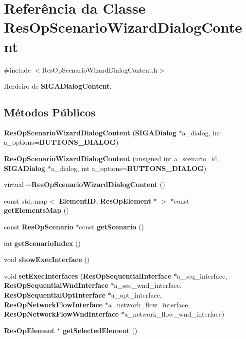 \section{Referência da Classe Res\+Op\+Scenario\+Wizard\+Dialog\+Content}
\label{class_res_op_scenario_wizard_dialog_content}


{\ttfamily \#include $<$Res\+Op\+Scenario\+Wizard\+Dialog\+Content.\+h$>$}



Herdeiro de {\bf S\+I\+G\+A\+Dialog\+Content}.

\subsection*{Métodos Públicos}
\begin{DoxyCompactItemize}
\item 
{\bf Res\+Op\+Scenario\+Wizard\+Dialog\+Content} ({\bf S\+I\+G\+A\+Dialog} $\ast$a\+\_\+dialog, int a\+\_\+options={\bf B\+U\+T\+T\+O\+N\+S\+\_\+\+D\+I\+A\+L\+OG})
\item 
{\bf Res\+Op\+Scenario\+Wizard\+Dialog\+Content} (unsigned int a\+\_\+scenario\+\_\+id, {\bf S\+I\+G\+A\+Dialog} $\ast$a\+\_\+dialog, int a\+\_\+options={\bf B\+U\+T\+T\+O\+N\+S\+\_\+\+D\+I\+A\+L\+OG})
\item 
virtual {\bf $\sim$\+Res\+Op\+Scenario\+Wizard\+Dialog\+Content} ()
\item 
const std\+::map$<$ {\bf Element\+ID}, {\bf Res\+Op\+Element} $\ast$ $>$ $\ast$const {\bf get\+Elements\+Map} ()
\item 
const {\bf Res\+Op\+Scenario} $\ast$const {\bf get\+Scenario} ()
\item 
int {\bf get\+Scenario\+Index} ()
\item 
void {\bf show\+Exec\+Interface} ()
\item 
void {\bf set\+Exec\+Interfaces} ({\bf Res\+Op\+Sequential\+Interface} $\ast$a\+\_\+seq\+\_\+interface, {\bf Res\+Op\+Sequential\+Wnd\+Interface} $\ast$a\+\_\+seq\+\_\+wnd\+\_\+interface, {\bf Res\+Op\+Sequential\+Opt\+Interface} $\ast$a\+\_\+opt\+\_\+interface, {\bf Res\+Op\+Network\+Flow\+Interface} $\ast$a\+\_\+network\+\_\+flow\+\_\+interface, {\bf Res\+Op\+Network\+Flow\+Wnd\+Interface} $\ast$a\+\_\+network\+\_\+flow\+\_\+wnd\+\_\+interface)
\item 
{\bf Res\+Op\+Element} $\ast$ {\bf get\+Selected\+Element} ()
\end{DoxyCompactItemize}
